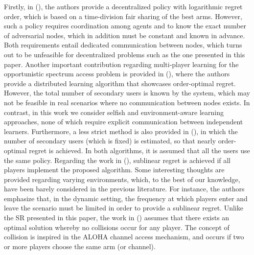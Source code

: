 \documentclass{article}
\begin{document}
Firstly, in (\citealp{liu2010distributed}), the authors provide a decentralized policy with logarithmic regret order, which is based on a time-division fair sharing of the best arms. However, such a policy requires coordination among agents and to know the exact number of adversarial nodes, which in addition must be constant and known in advance. Both requirements entail dedicated communication between nodes, which turns out to be unfeasible for decentralized problems such as the one presented in this paper. Another important contribution regarding multi-player learning for the opportunistic spectrum access problem is provided in (\citealp{anandkumar2011distributed}), where the authors provide a distributed learning algorithm that showcases order-optimal regret. However, the total number of secondary users is known by the system, which may not be feasible in real scenarios where no communication between nodes exists. In contrast, in this work we consider selfish and environment-aware learning approaches, none of which require explicit communication between independent learners. Furthermore, a less strict method is also provided in (\citealp{anandkumar2011distributed}), in which the number of secondary users (which is fixed) is estimated, so that nearly order-optimal regret is achieved. In both algorithms, it is assumed that all the users use the same policy. Regarding the work in (\citealp{rosenski2016multi}), sublinear regret is achieved if all players implement the proposed algorithm. Some interesting thoughts are provided regarding varying environments, which, to the best of our knowledge, have been barely considered in the previous literature. For instance, the authors emphasize that, in the dynamic setting, the frequency at which players enter and leave the scenario must be limited in order to provide a sublinear regret. Unlike the SR presented in this paper, the work in (\citealp{rosenski2016multi}) assumes that there exists an optimal solution whereby no collisions occur for any player. The concept of collision is inspired in the ALOHA channel access mechanism, and occurs if two or more players choose the same arm (or channel). 
 
\end{document}
